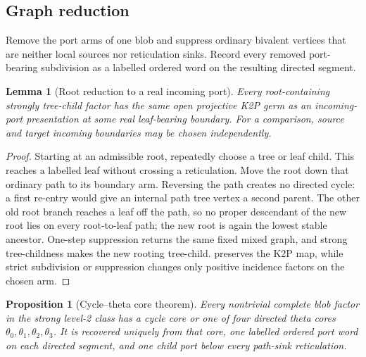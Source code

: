 \documentclass[11pt]{article}
\newtheorem{proposition}[theorem]{Proposition}
\newtheorem{lemma}[theorem]{Lemma}
\theoremstyle{remark}
\newcommand{\1}{\mathbf 1}
\begin{document}
\subsection{Graph reduction}

Remove the port arms of one blob and suppress ordinary bivalent vertices that
are neither local sources nor reticulation sinks.  Record every removed
port-bearing subdivision as a labelled ordered word on the resulting directed
segment.

\begin{lemma}[Root reduction to a real incoming port]\label{lem:root-reduction}
Every root-containing strongly tree-child factor has the same open projective
K2P germ as an incoming-port presentation at some real leaf-bearing boundary.
For a comparison, source and target incoming boundaries may be chosen
independently.
\end{lemma}

\begin{proof}
Starting at an admissible root, repeatedly choose a tree or leaf child.  This
reaches a labelled leaf without crossing a reticulation.  Move the root down
that ordinary path to its boundary arm.  Reversing the path creates no
directed cycle: a first re-entry would give an internal path tree vertex a
second parent.  The other old root branch reaches a leaf off the path, so no
proper descendant of the new root lies on every root-to-leaf path; the new
root is again the lowest stable ancestor.  One-step suppression returns the
same fixed mixed graph, and strong tree-childness makes the new rooting
tree-child.   preserves the K2P map, while strict
subdivision or suppression changes only positive incidence factors on the
chosen arm.
\end{proof}

\begin{proposition}[Cycle--theta core theorem]\label{prop:cores}
Every nontrivial complete blob factor in the strong level-2 class has a cycle
core or one of four directed theta cores \(\theta_0,\theta_1,\theta_2,
\theta_3\).  It is recovered uniquely from that core, one labelled ordered
port word on each directed segment, and one child port below every path-sink
reticulation.
\end{proposition}
\end{document}
